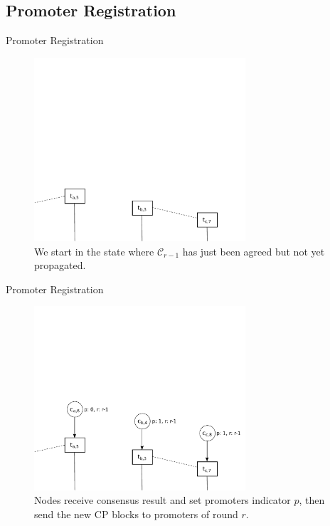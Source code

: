 \documentclass{beamer}
\begin{document}
\subsection{Promoter Registration}
\begin{frame}{Promoter Registration}

  \begin{figure}[h]
  \includegraphics[width=0.7\textwidth]{trustchain-1}
  \centering
  \caption{We start in the state where $\mathcal{C}_{r - 1}$ has just been agreed but
    not yet propagated.}
  \end{figure}

\end{frame}

\begin{frame}{Promoter Registration}

  \begin{figure}[h]
  \includegraphics[width=0.7\textwidth]{trustchain-2}
  \centering
  \caption{Nodes receive consensus result and set promoters indicator $p$, then
    send the new CP blocks to promoters of round $r$.}
  \end{figure}

\end{frame}
\end{document}
